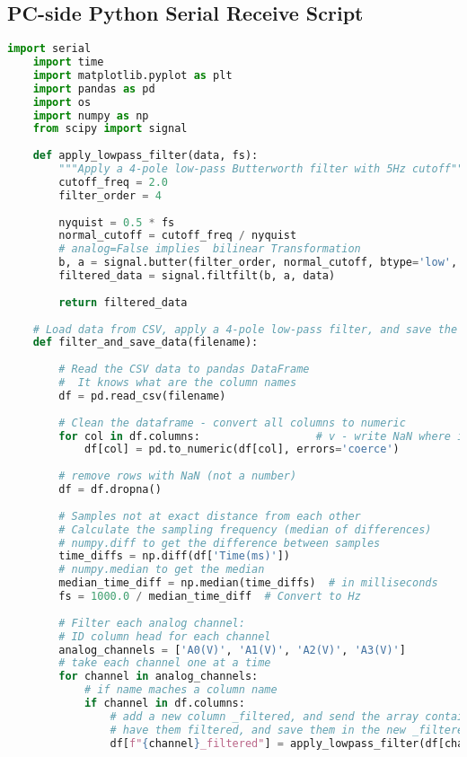 \subsection{PC-side Python Serial Receive Script}
\begin{lstlisting}[style=pythonstyle, caption=Python Serial Receive Script, label=lst:pythonCodeApp, language=Python ]
    import serial
    import time
    import matplotlib.pyplot as plt
    import pandas as pd
    import os
    import numpy as np
    from scipy import signal
    
    def apply_lowpass_filter(data, fs):
        """Apply a 4-pole low-pass Butterworth filter with 5Hz cutoff"""
        cutoff_freq = 2.0
        filter_order = 4
        
        nyquist = 0.5 * fs
        normal_cutoff = cutoff_freq / nyquist
        # analog=False implies  bilinear Transformation
        b, a = signal.butter(filter_order, normal_cutoff, btype='low', analog=False)
        filtered_data = signal.filtfilt(b, a, data)
        
        return filtered_data
    
    # Load data from CSV, apply a 4-pole low-pass filter, and save the filtered data
    def filter_and_save_data(filename):
        
        # Read the CSV data to pandas DataFrame
        #  It knows what are the column names
        df = pd.read_csv(filename)
        
        # Clean the dataframe - convert all columns to numeric
        for col in df.columns:                  # v - write NaN where it can't convert to number (in teh data, not column names)
            df[col] = pd.to_numeric(df[col], errors='coerce')
    
        # remove rows with NaN (not a number)
        df = df.dropna()
        
        # Samples not at exact distance from each other
        # Calculate the sampling frequency (median of differences)
        # numpy.diff to get the difference between samples
        time_diffs = np.diff(df['Time(ms)'])
        # numpy.median to get the median
        median_time_diff = np.median(time_diffs)  # in milliseconds
        fs = 1000.0 / median_time_diff  # Convert to Hz
        
        # Filter each analog channel:
        # ID column head for each channel 
        analog_channels = ['A0(V)', 'A1(V)', 'A2(V)', 'A3(V)']
        # take each channel one at a time
        for channel in analog_channels:
            # if name maches a column name
            if channel in df.columns:
                # add a new column _filtered, and send the array containing all the raw values to 
                # have them filtered, and save them in the new _filtered column
                df[f"{channel}_filtered"] = apply_lowpass_filter(df[channel].values, fs)
        

\end{lstlisting}
